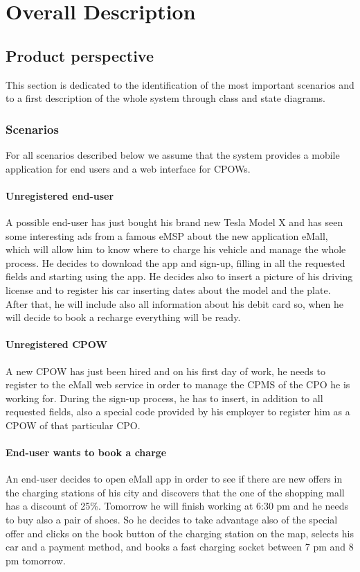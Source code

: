 \documentclass[a4paper]{report}
\begin{document}
\chapter{Overall Description}
\section{Product perspective}
This section is dedicated to the identification of the most important scenarios and to a first description of the whole system through class and state diagrams.
\subsection{Scenarios}
For all scenarios described below we assume that the system provides a mobile application for end users and a web interface for CPOWs.
\subsubsection{Unregistered end-user}
A possible end-user has just bought his brand new Tesla Model X and has seen some interesting ads from a famous eMSP about the new application eMall, which will allow him to know where to charge his vehicle and manage the whole process. He decides to download the app and sign-up, filling in all the requested fields and starting using the app. He decides also to insert a picture of his driving license and to register his car inserting dates about the model and the plate. After that, he will include also all information about his debit card so, when he will decide to book a recharge everything will be ready.

\subsubsection{Unregistered CPOW}
A new CPOW has just been hired and on his first day of work, he needs to register to the eMall web service in order to manage the CPMS of the CPO he is working for. During the sign-up process, he has to insert, in addition to all requested fields, also a special code provided by his employer to register him as a CPOW of that particular CPO.

\subsubsection{End-user wants to book a charge}
An end-user decides to open eMall app in order to see if there are new offers in the charging stations of his city and discovers that the one of the shopping mall has a discount of 25\%. Tomorrow he will finish working at 6:30 pm and he needs to buy also a pair of shoes. So he decides to take advantage also of the special offer and clicks on the book button of the charging station on the map, selects his car and a payment method, and books a fast charging socket between 7 pm and 8 pm tomorrow.
\end{document}
